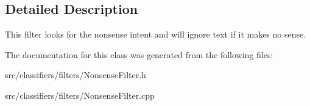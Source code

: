 \subsection{Detailed Description}
This filter looks for the nonsense intent and will ignore text if it makes no sense. 

The documentation for this class was generated from the following files\+:\begin{DoxyCompactItemize}
\item 
src/classifiers/filters/Nonsense\+Filter.\+h\item 
src/classifiers/filters/Nonsense\+Filter.\+cpp\end{DoxyCompactItemize}
